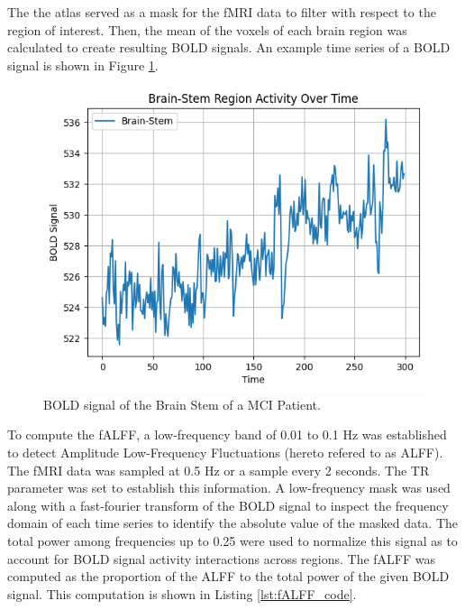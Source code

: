 \documentclass[12pt]{article}
\begin{document}
The the atlas served as a mask for the fMRI data to filter with respect to the region of interest. Then, the mean of the voxels of each brain region was calculated to create resulting BOLD signals. An example time series of a BOLD signal is shown in Figure \ref{fig:BOLD}.

\begin{figure}[h]  %
    \centering
    \includegraphics[width=\textwidth]{"../img/BOLD.png"}  %
    \caption{BOLD signal of the Brain Stem of a MCI Patient.}
    \label{fig:BOLD}  %
\end{figure}

\FloatBarrier  %

To compute the fALFF, a low-frequency band of 0.01 to 0.1 Hz was established to detect Amplitude Low-Frequency Fluctuations (hereto refered to as ALFF). The fMRI data was sampled at 0.5 Hz or a sample every 2 seconds. The TR parameter was set to establish this information. A low-frequency mask was used along with a fast-fourier transform of the BOLD signal to inspect the frequency domain of each time series to identify the absolute value of the masked data. The total power among frequencies up to 0.25 were used to normalize this signal as to account for BOLD signal activity interactions across regions. The fALFF was computed as the proportion of the ALFF to the total power of the given BOLD signal. This computation is shown in Listing \ref{lst:fALFF_code}.
\end{document}
